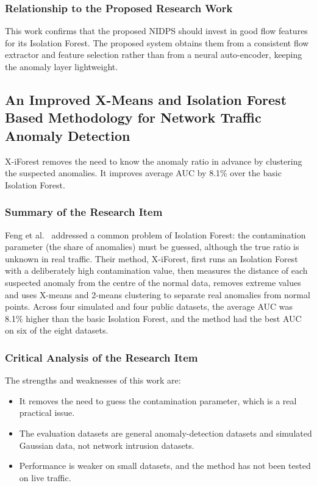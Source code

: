 \subsubsection{Relationship to the Proposed Research Work}\label{sec:3.2.10.3}

\noindent This work confirms that the proposed NIDPS should invest in good flow features for its Isolation Forest. The proposed system obtains them from a consistent flow extractor and feature selection rather than from a neural auto-encoder, keeping the anomaly layer lightweight.

\subsection{An Improved X-Means and Isolation Forest Based Methodology for Network Traffic Anomaly Detection}\label{sec:3.2.11}

\noindent X-iForest removes the need to know the anomaly ratio in advance by clustering the suspected anomalies. It improves average AUC by 8.1\% over the basic Isolation Forest.

\subsubsection{Summary of the Research Item}\label{sec:3.2.11.1}

\noindent Feng et al.~\cite{lr:feng2022} addressed a common problem of Isolation Forest: the contamination parameter (the share of anomalies) must be guessed, although the true ratio is unknown in real traffic. Their method, X-iForest, first runs an Isolation Forest with a deliberately high contamination value, then measures the distance of each suspected anomaly from the centre of the normal data, removes extreme values and uses X-means and 2-means clustering to separate real anomalies from normal points. Across four simulated and four public datasets, the average AUC was 8.1\% higher than the basic Isolation Forest, and the method had the best AUC on six of the eight datasets.

\subsubsection{Critical Analysis of the Research Item}\label{sec:3.2.11.2}

\noindent The strengths and weaknesses of this work are:

\begin{itemize}
\item It removes the need to guess the contamination parameter, which is a real practical issue.
\item The evaluation datasets are general anomaly-detection datasets and simulated Gaussian data, not network intrusion datasets.
\item Performance is weaker on small datasets, and the method has not been tested on live traffic.
\end{itemize}

